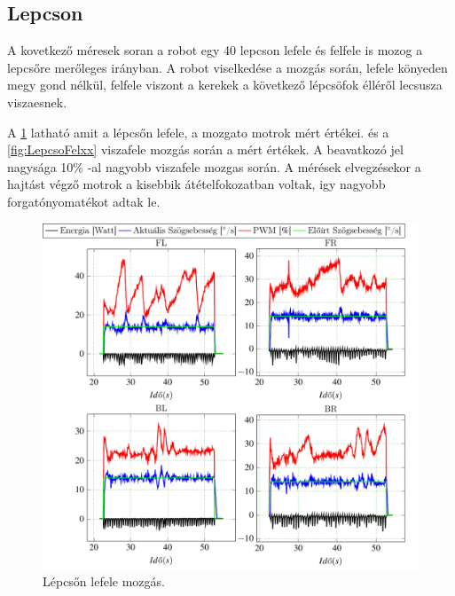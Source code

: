 \subsection{Lepcson}




\renewcommand{\GlobalPath}{Meresek/Mozgasok/Lepcso}
\renewcommand{\secondImage}{*} 

%

%


A kovetkező méresek soran a robot egy 40 \degree lepcson lefele és felfele is mozog a lepcsőre merőleges irányban. A robot viselkedése a mozgás során, lefele könyeden megy gond nélkül, felfele viszont a kerekek a következő lépcsöfok élléről lecsusza viszaesnek.

A \ref{fig:LepcsoLexx} latható amit a lépcsőn lefele, a mozgato motrok mért értékei. és a \ref{fig:LepcsoFelxx} viszafele mozgás során a mért értékek. A beavatkozó jel nagysága 10\% -al  nagyobb viszafele mozgas során. A mérések elvegzésekor a hajtást végző motrok a kisebbik átételfokozatban voltak, igy nagyobb forgatónyomatékot adtak le.

\begin{figure}[H]
  \includegraphics{tikz/LepcsoLexx.pdf}
  \caption{Lépcsőn lefele mozgás.}
  \label{fig:LepcsoLexx}
\end{figure}

